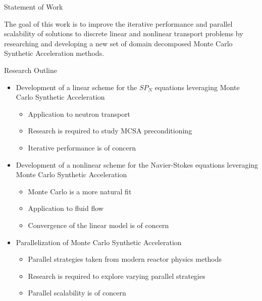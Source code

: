 \documentclass{beamer}
\begin{document}
\begin{frame}{Statement of Work}

  The goal of this work is to improve the iterative performance and
  parallel scalability of solutions to discrete linear and nonlinear
  transport problems by researching and developing a new set of domain
  decomposed Monte Carlo Synthetic Acceleration methods.

\end{frame}

\begin{frame}{Research Outline}
  \begin{itemize}
  \item Development of a linear scheme for the $SP_N$ equations
    leveraging Monte Carlo Synthetic Acceleration
    \medskip
    \begin{itemize}
    \item Application to neutron transport
    \item Research is required to study MCSA preconditioning
    \item Iterative performance is of concern
    \end{itemize}
    \bigskip
  \item Development of a nonlinear scheme for the Navier-Stokes
    equations leveraging Monte Carlo Synthetic Acceleration
    \medskip
    \begin{itemize}
    \item Monte Carlo is a more natural fit
    \item Application to fluid flow
    \item Convergence of the linear model is of concern
    \end{itemize}
    \bigskip
  \item Parallelization of Monte Carlo Synthetic Acceleration
    \medskip
    \begin{itemize}
    \item Parallel strategies taken from modern reactor physics
      methods
    \item Research is required to explore varying parallel strategies
    \item Parallel scalability is of concern
    \end{itemize}
  \end{itemize}
\end{frame}
\end{document}
